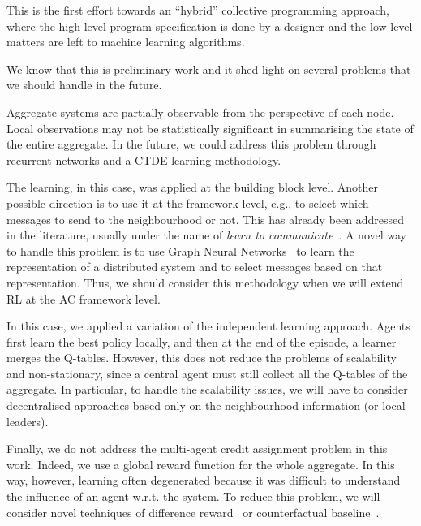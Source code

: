\documentclass[conference]{IEEEtran}
\begin{document}
This is the first effort towards an ``hybrid'' collective programming approach, where the high-level program specification is 
 done by a designer and the low-level matters are left to machine learning algorithms.

We know that this is preliminary work and it shed light on several problems that we should handle in the future.

Aggregate systems are partially observable from the perspective of each node. 
 Local observations may not be statistically significant in summarising the state of the entire aggregate. 
 In the future, we could address this problem through recurrent networks and a CTDE learning methodology.
 
The learning, in this case, was applied at the building block level. 
 Another possible direction is to use it at the framework level, e.g., to select which messages to send to the neighbourhood or not. 
 This has already been addressed in the literature, usually under the name of \textit{learn to communicate}~\cite{DBLP:journals/corr/abs-1908-03963}. 
 A novel way to handle this problem is to use Graph Neural Networks~\cite{DBLP:journals/corr/abs-1812-08434} to learn the representation of a distributed system and to select messages based on that representation. 
 Thus, we should consider this methodology when we will extend RL at the AC framework level.
 
In this case, we applied a variation of the independent learning approach. 
 Agents first learn the best policy locally, and then at the end of the episode, a learner merges the Q-tables. 
 However, this does not reduce the problems of scalability and non-stationary, since a central agent must still collect all the Q-tables of the aggregate. 
 In particular, to handle the scalability issues, we will have to consider decentralised approaches based only on the neighbourhood information (or local leaders).
 
Finally, we do not address the multi-agent credit assignment problem in this work. 
 Indeed, we use a global reward function for the whole aggregate. In this way, however, learning often degenerated because it was difficult to understand the influence of an agent w.r.t. the system. 
 To reduce this problem, we will consider novel techniques of difference reward~\cite{DBLP:conf/atal/AgoginoT04} or counterfactual baseline~\cite{DBLP:journals/corr/FoersterFANW17}.



\end{document}
